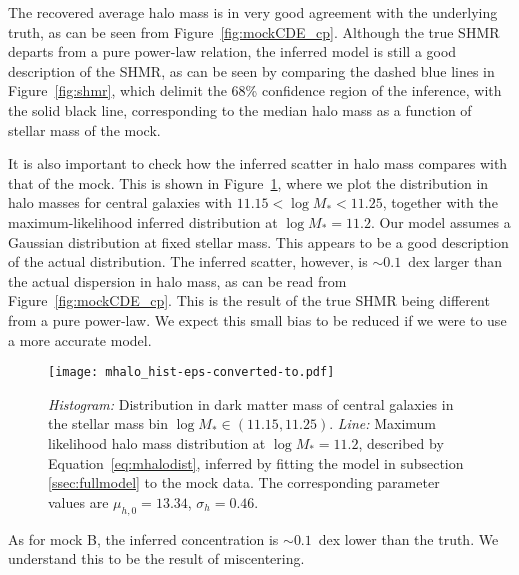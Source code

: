 \documentclass[usenatbib]{mnras}
\def\mstar{M_*}
\def\mhalo{M_{h}}
\def\Fref#1{Figure~\ref{#1}\xspace}
\def\Eref#1{Equation~\ref{#1}\xspace}
\begin{document}
The recovered average halo mass is in very good agreement with the underlying truth, as can be seen from \Fref{fig:mockCDE_cp}. 
Although the true SHMR departs from a pure power-law relation, the inferred model is still a good description of the SHMR, as can be seen by comparing the dashed blue lines in \Fref{fig:shmr}, which delimit the 68\% confidence region of the inference, with the solid black line, corresponding to the median halo mass as a function of stellar mass of the mock.

It is also important to check how the inferred scatter in halo mass compares with that of the mock.
This is shown in 
\Fref{fig:mhalodist}, where we plot the distribution in halo masses for central galaxies with $11.15 < \log{\mstar} < 11.25$, together with the maximum-likelihood inferred distribution at $\log{\mstar}=11.2$.
Our model assumes a Gaussian distribution at fixed stellar mass.
This appears to be a good description of the actual distribution.
The inferred scatter, however, is $\sim0.1$~dex larger than the actual dispersion in halo mass, as can be read from \Fref{fig:mockCDE_cp}.
This is the result of the true SHMR being different from a pure power-law. We expect this small bias to be reduced if we were to use a more accurate model.
%
\begin{figure}
 \texttt{[image: mhalo\_hist-eps-converted-to.pdf]}
 \caption{{\em Histogram:} Distribution in dark matter mass of central galaxies in the stellar mass bin $\log{\mstar} \in (11.15, 11.25)$. {\em Line:} Maximum likelihood halo mass distribution at $\log{\mstar}=11.2$, described by \Eref{eq:mhalodist}, inferred by fitting the model in subsection \ref{ssec:fullmodel} to the mock data. The corresponding parameter values are $\mu_{h,0}=13.34$, $\sigma_h=0.46$.}
 \label{fig:mhalodist}
\end{figure}
%
As for mock B, the inferred concentration is $\sim0.1$~dex lower than the truth. We understand this to be the result of miscentering.
\end{document}
